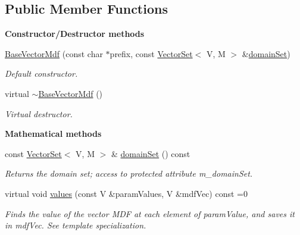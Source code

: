 \subsection*{Public Member Functions}
\begin{Indent}{\bf Constructor/\-Destructor methods}\par
\begin{DoxyCompactItemize}
\item 
\hyperlink{class_q_u_e_s_o_1_1_base_vector_mdf_a8f07d6a9201d20e195b8cabcaa35f8c5}{Base\-Vector\-Mdf} (const char $\ast$prefix, const \hyperlink{class_q_u_e_s_o_1_1_vector_set}{Vector\-Set}$<$ V, M $>$ \&\hyperlink{class_q_u_e_s_o_1_1_base_vector_mdf_ab060724f092b6623df50c0d0d725174c}{domain\-Set})
\begin{DoxyCompactList}\small\item\em Default constructor. \end{DoxyCompactList}\item 
virtual \hyperlink{class_q_u_e_s_o_1_1_base_vector_mdf_a91b8af0e2485cf6b16e0d9c6e6142899}{$\sim$\-Base\-Vector\-Mdf} ()
\begin{DoxyCompactList}\small\item\em Virtual destructor. \end{DoxyCompactList}\end{DoxyCompactItemize}
\end{Indent}
\begin{Indent}{\bf Mathematical methods}\par
\begin{DoxyCompactItemize}
\item 
const \hyperlink{class_q_u_e_s_o_1_1_vector_set}{Vector\-Set}$<$ V, M $>$ \& \hyperlink{class_q_u_e_s_o_1_1_base_vector_mdf_ab060724f092b6623df50c0d0d725174c}{domain\-Set} () const 
\begin{DoxyCompactList}\small\item\em Returns the domain set; access to protected attribute m\-\_\-domain\-Set. \end{DoxyCompactList}\item 
virtual void \hyperlink{class_q_u_e_s_o_1_1_base_vector_mdf_a8b7826a86f4034d8960ff92ebf79a32b}{values} (const V \&param\-Values, V \&mdf\-Vec) const =0
\begin{DoxyCompactList}\small\item\em Finds the value of the vector M\-D\-F at each element of {\ttfamily param\-Value}, and saves it in {\ttfamily mdf\-Vec}. See template specialization. \end{DoxyCompactList}\end{DoxyCompactItemize}
\end{Indent}

